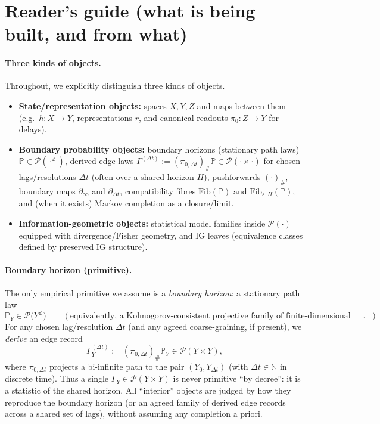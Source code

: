 \documentclass[11pt]{article}
\newcommand{\Pcal}{\mathcal{P}}
\newcommand{\Fib}{\mathrm{Fib}} %
\begin{document}
\tableofcontents

\section*{Reader's guide (what is being built, and from what)}

\paragraph{Three kinds of objects.}
Throughout, we explicitly distinguish three kinds of objects.

\begin{itemize}[leftmargin=1.6em]
\item \textbf{State/representation objects:} spaces $X,Y,Z$ and maps between them (e.g.\ $h:X\to Y$, representations $r$, and canonical readouts $\pi_0:Z\to Y$ for delays).
\item \textbf{Boundary probability objects:} boundary horizons (stationary path laws) $\mathbb P\in\Pcal(\cdot^{\mathbb Z})$, derived edge laws $\Gamma^{(\Delta t)}:=(\pi_{0,\Delta t})_\#\mathbb P\in\Pcal(\cdot\times\cdot)$ for chosen lags/resolutions $\Delta t$ (often over a shared horizon $H$), pushforwards $(\cdot)_\#$, boundary maps $\partial_\infty$ and $\partial_{\Delta t}$, compatibility fibres $\Fib(\mathbb P)$ and $\Fib_{\varepsilon,H}(\mathbb P)$, and (when it exists) Markov completion as a closure/limit.
\item \textbf{Information-geometric objects:} statistical model families inside $\Pcal(\cdot)$ equipped with divergence/Fisher geometry, and IG leaves (equivalence classes defined by preserved IG structure).
\end{itemize}

\paragraph{Boundary horizon (primitive).}
The only empirical primitive we assume is a \emph{boundary horizon}: a stationary path law
\[
\mathbb P_Y \in \Pcal\bigl(Y^{\mathbb Z}\bigr)
\qquad
(\text{equivalently, a Kolmogorov-consistent projective family of finite-dimensional marginals}).
\]
For any chosen lag/resolution $\Delta t$ (and any agreed coarse-graining, if present), we \emph{derive} an edge record
\[
\Gamma_Y^{(\Delta t)} := (\pi_{0,\Delta t})_\# \mathbb P_Y \in \Pcal(Y\times Y),
\]
where $\pi_{0,\Delta t}$ projects a bi-infinite path to the pair $(Y_0,Y_{\Delta t})$ (with $\Delta t\in\mathbb N$ in discrete time).
Thus a single $\Gamma_Y\in\Pcal(Y\times Y)$ is never primitive ``by decree'': it is a statistic of the shared horizon.
All ``interior'' objects are judged by how they reproduce the boundary horizon (or an agreed family of derived edge records across a shared set of lags), without assuming any completion a priori.
\end{document}
